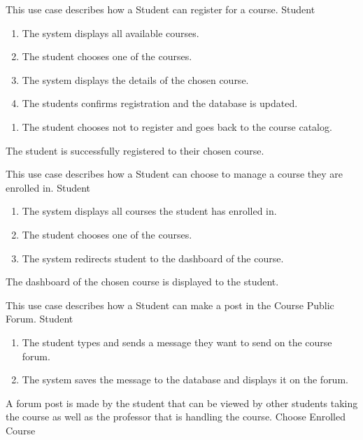 \documentclass[12pt, a4]{report}
\begin{document}

{ %
This use case describes how a Student can register for a course.
}
{ %
Student
}
{ %
\begin{enumerate}
    \item The system displays all available courses.
    \item The student chooses one of the courses.
    \item The system displays the details of the chosen course.
    \item The students confirms registration and the database is updated.
\end{enumerate}
}
{ %
\begin{enumerate}
    \item The student chooses not to register and goes back to the course catalog.
\end{enumerate}
}
{ %
}
{ %
The student is successfully registered to their chosen course.
}
{ %
}
{ %
}


{ %
This use case describes how a Student can choose to manage a course they are enrolled in.
}
{ %
Student
}
{ %
\begin{enumerate}
    \item The system displays all courses the student has enrolled in.
    \item The student chooses one of the courses.
    \item The system redirects student to the dashboard of the course.
\end{enumerate}
}
{ %
}
{ %
}
{ %
The dashboard of the chosen course is displayed to the student.
}
{ %
}
{ %
}


{ %
This use case describes how a Student can make a post in the Course Public Forum.
}
{ %
Student
}
{ %
\begin{enumerate}
    \item The student types and sends a message they want to send on the course forum.
    \item The system saves the message to the database and displays it on the forum.
\end{enumerate}
}
{ %
}
{ %
}
{ %
A forum post is made by the student that can be viewed by other students taking the course as well as the professor that is handling the course.
}
{ %
Choose Enrolled Course
}
{ %
}
\end{document}
